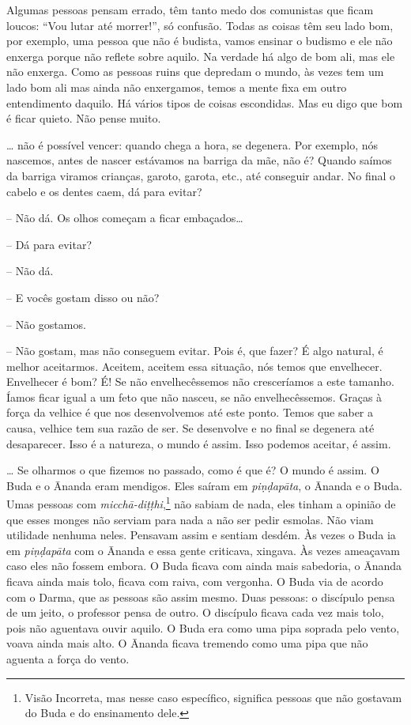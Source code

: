 Algumas pessoas pensam errado, têm tanto medo dos comunistas que
ficam loucos: “Vou lutar até morrer!”, só confusão. Todas as coisas têm
seu lado bom, por exemplo, uma pessoa que não é budista, vamos ensinar
o budismo e ele não enxerga porque não reflete sobre aquilo. Na verdade
há algo de bom ali, mas ele não enxerga. Como as pessoas ruins que
depredam o mundo, às vezes tem um lado bom ali mas ainda não
enxergamos, temos a mente fixa em outro entendimento daquilo. Há vários
tipos de coisas escondidas. Mas eu digo que bom é ficar quieto. Não
pense muito.

\ldots{} não é possível vencer: quando chega a hora, se degenera. Por
exemplo, nós nascemos, antes de nascer estávamos na barriga da mãe, não
é? Quando saímos da barriga viramos crianças, garoto, garota, etc., até
conseguir andar. No final o cabelo e os dentes caem, dá para evitar?

-- Não dá. Os olhos começam a ficar embaçados\ldots{}

-- Dá para evitar?

-- Não dá.

-- E vocês gostam disso ou não?

-- Não gostamos.

-- Não gostam, mas não conseguem evitar. Pois é, que fazer? É algo
natural, é melhor aceitarmos. Aceitem, aceitem essa situação, nós temos
que envelhecer. Envelhecer é bom? É! Se não envelhecêssemos não
cresceríamos a este tamanho. Íamos ficar igual a um feto que não
nasceu, se não envelhecêssemos. Graças à força da velhice é que nos
desenvolvemos até este ponto. Temos que saber a causa, velhice tem sua
razão de ser. Se desenvolve e no final se degenera até desaparecer.
Isso é a natureza, o mundo é assim. Isso podemos aceitar, é assim.

\ldots{} Se olharmos o que fizemos no passado, como é que é? O mundo é
assim. O Buda e o Ānanda eram mendigos. Eles saíram em
\emph{piṇḍapāta}, o Ānanda e o Buda. Umas pessoas com
\emph{micchā-diṭṭhi},\footnote{Visão Incorreta, mas nesse caso
específico, significa pessoas que não gostavam do Buda e do ensinamento
dele.} não sabiam de nada, eles tinham a opinião de que esses
monges não serviam para nada a não ser pedir esmolas. Não viam
utilidade nenhuma neles. Pensavam assim e sentiam desdém. Às vezes o
Buda ia em \emph{piṇḍapāta} com o Ānanda e essa gente criticava,
xingava. Às vezes ameaçavam caso eles não fossem embora. O Buda ficava
com ainda mais sabedoria, o Ānanda ficava ainda mais tolo, ficava com
raiva, com vergonha. O Buda via de acordo com o Darma, que as pessoas
são assim mesmo. Duas pessoas: o discípulo pensa de um jeito, o
professor pensa de outro. O discípulo ficava cada vez mais tolo, pois
não aguentava ouvir aquilo. O Buda era como uma pipa soprada pelo
vento, voava ainda mais alto. O Ānanda ficava tremendo como uma pipa
que não aguenta a força do vento.

